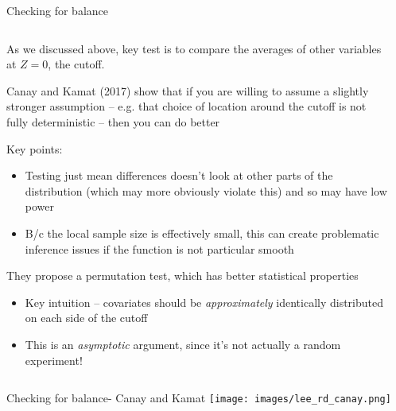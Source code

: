 \documentclass[notes,11pt, aspectratio=169]{beamer}
\newenvironment{wideitemize}{\itemize\addtolength{\itemsep}{10pt}}{\enditemize}
\begin{document}
\begin{frame}{Checking for balance}
  \begin{columns}[onlytextwidth, T] %
    \begin{column}{\textwidth}
      \begin{wideitemize}
      \item As we discussed above, key test is to compare the averages
        of other variables at $Z = 0$, the cutoff.
      \item Canay and Kamat (2017) show that if you are willing to
        assume a slightly stronger assumption -- e.g. that choice of
        location around the cutoff is not fully deterministic -- then
        you can do better
      \item Key points:
        \begin{itemize}
        \item Testing just mean differences doesn't look at other
          parts of the distribution (which may more obviously violate
          this) and so may have low power
        \item B/c the local sample size is effectively small, this can
          create problematic inference issues if the function is not
          particular smooth
        \end{itemize}
      \item They propose a permutation test, which has better
        statistical properties
        \begin{itemize}
        \item Key intuition -- covariates should be
          \emph{approximately} identically distributed on each side of
          the cutoff
        \item This is an \emph{asymptotic} argument, since it's not
          actually a random experiment!
        \end{itemize}
      \end{wideitemize}
    \end{column}%
    \hfill%
    \begin{column}{.5\textwidth}
    \end{column}%
  \end{columns}
\end{frame}

\begin{frame}{Checking for balance- Canay and Kamat}
  \texttt{[image: images/lee\_rd\_canay.png]}
\end{frame}
\end{document}
